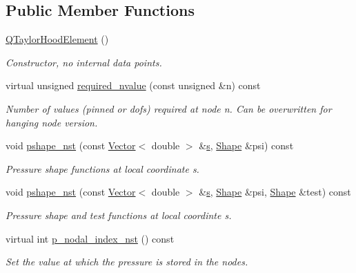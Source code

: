 \subsection*{Public Member Functions}
\begin{DoxyCompactItemize}
\item 
\hyperlink{classoomph_1_1QTaylorHoodElement_ab22b7ecce48963af9b7a2b35629e9108}{Q\+Taylor\+Hood\+Element} ()
\begin{DoxyCompactList}\small\item\em Constructor, no internal data points. \end{DoxyCompactList}\item 
virtual unsigned \hyperlink{classoomph_1_1QTaylorHoodElement_a7993924abd5095ebaa776ee0e080e600}{required\+\_\+nvalue} (const unsigned \&n) const
\begin{DoxyCompactList}\small\item\em Number of values (pinned or dofs) required at node n. Can be overwritten for hanging node version. \end{DoxyCompactList}\item 
void \hyperlink{classoomph_1_1QTaylorHoodElement_a791d591c9dbcc18f5843dd0df3a5210c}{pshape\+\_\+nst} (const \hyperlink{classoomph_1_1Vector}{Vector}$<$ double $>$ \&\hyperlink{cfortran_8h_ab7123126e4885ef647dd9c6e3807a21c}{s}, \hyperlink{classoomph_1_1Shape}{Shape} \&psi) const
\begin{DoxyCompactList}\small\item\em Pressure shape functions at local coordinate s. \end{DoxyCompactList}\item 
void \hyperlink{classoomph_1_1QTaylorHoodElement_a63b1c65111efb6bea78245b897516c71}{pshape\+\_\+nst} (const \hyperlink{classoomph_1_1Vector}{Vector}$<$ double $>$ \&\hyperlink{cfortran_8h_ab7123126e4885ef647dd9c6e3807a21c}{s}, \hyperlink{classoomph_1_1Shape}{Shape} \&psi, \hyperlink{classoomph_1_1Shape}{Shape} \&test) const
\begin{DoxyCompactList}\small\item\em Pressure shape and test functions at local coordinte s. \end{DoxyCompactList}\item 
virtual int \hyperlink{classoomph_1_1QTaylorHoodElement_a86f85131d3383d74ab40dfdb2213d8d5}{p\+\_\+nodal\+\_\+index\+\_\+nst} () const
\begin{DoxyCompactList}\small\item\em Set the value at which the pressure is stored in the nodes. \end{DoxyCompactList}\item 

\end{DoxyCompactItemize}
